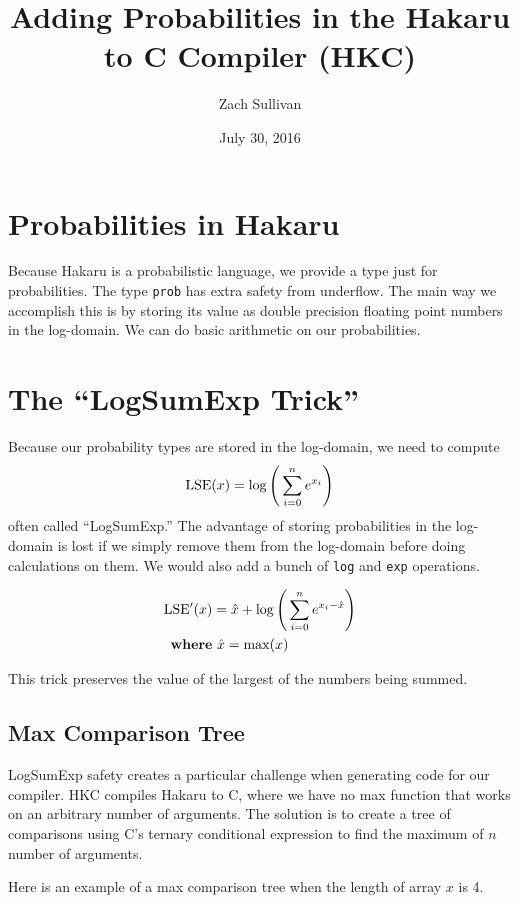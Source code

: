 \documentclass{article}
\title{Adding Probabilities in the Hakaru to C Compiler (HKC)}
\author{Zach Sullivan}
\date{July 30, 2016}
\begin{document}
\maketitle

\section*{Probabilities in Hakaru}

Because Hakaru is a probabilistic language, we provide a type just for
probabilities. The type {\tt prob} has extra safety from underflow. The main way
we accomplish this is by storing its value as double precision floating point
numbers in the log-domain. We can do basic arithmetic on our probabilities.

\section*{The ``LogSumExp Trick''}
Because our probability types are stored in the log-domain, we need to compute
\begin{displaymath}
{\rm LSE}(x) = \log\Bigg(\sum_{i=0}^{n}{e^{x_i}}\Bigg)
\end{displaymath}
often called ``LogSumExp.'' The advantage of storing probabilities in the
log-domain is lost if we simply remove them from the log-domain before doing
calculations on them. We would also add a bunch of {\tt log} and {\tt exp}
operations.

\begin{align*}
{\rm LSE^\prime}(x) &= \hat x + \log\Bigg(\sum_{i=0}^{n}{e^{x_i-\hat x}}\Bigg)\\
{\rm\bf where}&\ \hat x = {\rm max}(x)
\end{align*}

This trick preserves the value of the largest of the numbers being summed.


\subsection*{Max Comparison Tree}
LogSumExp safety creates a particular challenge when generating code for our
compiler. HKC compiles Hakaru to C, where we have no max function that works
on an arbitrary number of arguments. The solution is to create a tree of
comparisons using C's ternary conditional expression to find the maximum of $n$
number of arguments.

Here is an example of a max comparison tree when the length of array $x$ is
4.
\end{document}
